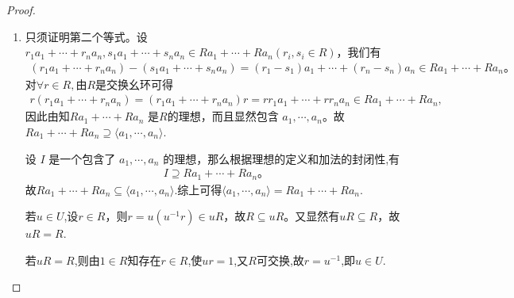 \documentclass[../../main.tex]{subfiles}%
\begin{document}
\begin{proof}
\begin{enumerate}[(1)]
\item 只须证明第二个等式。设 $r_1a_1 + \cdots + r_na_n, s_1a_1 + \cdots + s_na_n \in Ra_1+\cdots+Ra_n(r_i, s_i \in R)$，我们有
\begin{align*}
(r_1a_1 + \cdots + r_na_n) - (s_1a_1 + \cdots + s_na_n) = (r_1 - s_1)a_1 + \cdots + (r_n - s_n)a_n \in Ra_1 + \cdots + Ra_n 。
\end{align*}
对$\forall r\in R,$由$R$是交换幺环可得
\begin{align*}
r\left( r_1a_1+\cdots +r_na_n \right) =\left( r_1a_1+\cdots +r_na_n \right) r=rr_1a_1+\cdots +rr_na_n\in Ra_1+\cdots +Ra_n,
\end{align*}
因此由知$Ra_1 + \cdots + Ra_n$ 是$R$的理想，而且显然包含 $a_1, \cdots, a_n$。故$Ra_1+\cdots +Ra_n\supseteq \langle a_1,\cdots ,a_n\rangle.$

设 $I$ 是一个包含了 $a_1, \cdots, a_n$ 的理想，那么根据理想的定义和加法的封闭性,有
\begin{align*}
I \supseteq Ra_1 + \cdots + Ra_n 。
\end{align*}
故$Ra_1+\cdots +Ra_n\subseteq \langle a_1,\cdots ,a_n\rangle$.综上可得$\langle a_1,\cdots ,a_n\rangle =Ra_1+\cdots +Ra_n.$

若$u\in U$,设$r\in R$，则$r=u(u^{-1}r)\in uR$，故$R\subseteq uR$。又显然有$uR\subseteq R$，故$uR=R$.

若$uR=R$,则由$1\in R$知存在$r\in R$,使$ur=1$,又$R$可交换,故$r=u^{-1}$,即$u\in U$.
\end{enumerate}

\end{proof}
\end{document}
